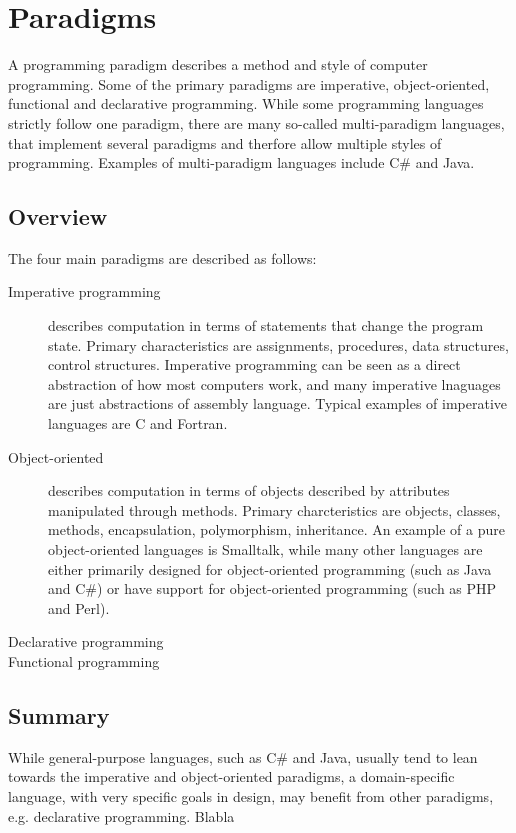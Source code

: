 \section{Paradigms}

A programming paradigm describes a method and style of computer programming.
Some of the primary paradigms are imperative, object-oriented, functional and declarative programming. While some programming languages strictly follow one paradigm, there are many so-called multi-paradigm languages, that implement several paradigms and therfore allow multiple styles of programming. Examples of multi-paradigm languages include C\# and Java.

\subsection{Overview}
The four main paradigms are described as follows:
\begin{description}
\item[Imperative programming] describes computation in terms of statements that change the program state. Primary characteristics are assignments, procedures, data structures, control structures. Imperative programming can be seen as a direct abstraction of how most computers work, and many imperative lnaguages are just abstractions of assembly language. Typical examples of imperative languages are C and Fortran.
\item[Object-oriented] describes computation in terms of objects described by attributes manipulated through methods. Primary charcteristics are objects, classes, methods, encapsulation, polymorphism, inheritance. An example of a pure object-oriented languages is Smalltalk, while many other languages are either primarily designed for object-oriented programming (such as Java and C\#) or have support for object-oriented programming (such as PHP and Perl).
\item[Declarative programming]
\item[Functional programming]
\end{description}

\subsection{Summary}

While general-purpose languages, such as C\# and Java, usually tend to lean towards the imperative and object-oriented paradigms, a domain-specific language, with very specific goals in design, may benefit from other paradigms, e.g. declarative programming.
Blabla
